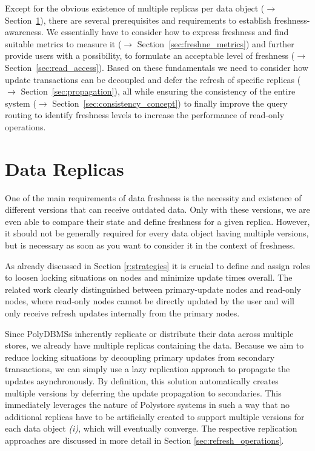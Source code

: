 Except for the obvious existence of multiple replicas per data object ($\rightarrow$ Section~\ref{sec:data_replicas}), 
there are several prerequisites and requirements to establish freshness-awareness. 
We essentially have to consider how to express freshness and find suitable metrics to measure it ($\rightarrow$ Section~\ref{sec:freshne_metrics})
and further provide users with a possibility, to formulate an acceptable level of freshness ($\rightarrow$ Section~\ref{sec:read_access}). 
Based on these fundamentals we need to consider how update transactions can be decoupled and defer the refresh of specific replicas 
($\rightarrow$ Section~\ref{sec:propagation}), all while ensuring the consistency of the entire system ($\rightarrow$ Section~\ref{sec:consistency_concept}) to finally 
improve the query routing to identify freshness levels to increase the performance of read-only operations. 



\section{Data Replicas}
\label{sec:data_replicas}

One of the main requirements of data freshness is the necessity and existence of different versions that can receive outdated data. 
Only with these versions, we are even able to compare their state and define freshness for a given replica.
However, it should not be generally required for every data object having multiple versions, but is necessary as soon 
as you want to consider it in the context of freshness.

As already discussed in Section \ref{r:strategies} it is crucial to define and assign roles to loosen locking situations on nodes
and minimize update times overall.
The related work clearly distinguished between primary-update nodes and read-only nodes, where 
read-only nodes cannot be directly updated by the user and will only receive refresh updates internally from the primary nodes.

Since PolyDBMSs inherently replicate or distribute their data across multiple stores, we already have multiple replicas containing the data. 
Because we aim to reduce locking situations by decoupling primary updates from secondary transactions,
we can simply use a lazy replication approach to propagate the updates asynchronously. 
By definition, this solution automatically creates multiple versions by deferring the update propagation to secondaries.
This immediately leverages the nature of Polystore systems in such a way that no additional replicas have to be artificially created
to support multiple versions for each data object \textit{(i)}, which will eventually converge. 
The respective replication approaches are discussed in more detail in Section \ref{sec:refresh_operations}.

